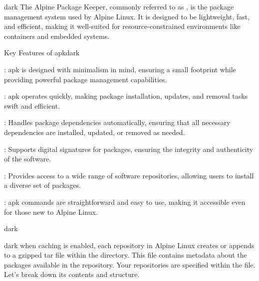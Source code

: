 \label{Alpine Package Keeper}
\begin{baseBoxThree}{}{dark}
    \bigskip
    The Alpine Package Keeper, commonly referred to as , is the package management system used by Alpine Linux.
    It is designed to be lightweight, fast, and efficient, making it well-suited for resource-constrained environments like containers and embedded systems.
    \bigskip
    \begin{baseBoxThree}{Key Features of apk}{dark}
        \smallskip
        \begin{posnexItemize} 
            \item[\sA] : apk is designed with minimalism in mind, ensuring a small footprint while providing powerful package management capabilities.
            \item[\sA] : apk operates quickly, making package installation, updates, and removal tasks swift and efficient.
            \item[\sA] : Handles package dependencies automatically, ensuring that all necessary dependencies are installed, updated, or removed as needed.
            \item[\sA] : Supports digital signatures for packages, ensuring the integrity and authenticity of the software.
            \item[\sA] : Provides access to a wide range of software repositories, allowing users to install a diverse set of packages.
            \item[\sA] : apk commands are straightforward and easy to use, making it accessible even for those new to Alpine Linux.
        \end{posnexItemize}
        \smallskip
    \end{baseBoxThree}
    \smallskip
    \label{APK Metadata}
    \begin{baseBoxThree}{}{dark}
        \smallskip
        \begin{baseBoxThree}{}{dark}
            \smallskip
            when caching is enabled, each repository in Alpine Linux creates or appends to a gzipped tar file within the  directory.
            This file contains metadata about the packages available in the repository.
            Your repositories are specified within the  file.
            Let's break down its contents and structure.
            \smallskip
        \end{baseBoxThree}
        \smallskip
    \end{baseBoxThree}
    \smallskip
\end{baseBoxThree}

